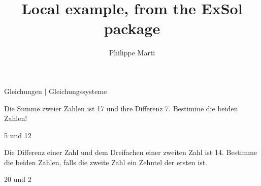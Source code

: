 \documentclass[a4paper,10pt]{article}
\title{Local example, from the \textsf{ExSol} package}
\author{Philippe Marti}
\begin{document}
\maketitle

\section{\exercisesname}

\begin{exerciseseries}[columns=2,solsubrule=\hrule]{Gleichungen $|$ Gleichungssysteme}

  \begin{exercise}
    Die Summe zweier Zahlen ist 17 und ihre Differenz 7. Bestimme die
    beiden Zahlen!
  \end{exercise}
  \begin{solution}
    5 und 12
  \end{solution}

  \begin{exercise}
    Die Differenz einer Zahl und dem Dreifachen einer zweiten Zahl ist
    14. Bestimme die beiden Zahlen, falls die zweite Zahl ein Zehntel
    der ersten ist.
  \end{exercise}
  \begin{solution}
    20 und 2
  \end{solution}

\end{exerciseseries}
\end{document}
